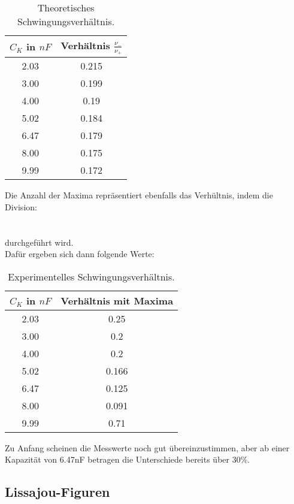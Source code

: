 \begin{table}
  \centering
  \caption{Theoretisches Schwingungsverhältnis.}
  \label{tab:tab6}
  \begin{tabular}{c c}
    \toprule
    \(C_K\) in $nF$ & Verhältnis \(\frac{\nu_-}{\nu_+}\)\\
    \midrule
    2.03 & 0.215\\
    3.00 & 0.199\\
    4.00 & 0.19\\
    5.02 & 0.184\\
    6.47 & 0.179\\
    8.00 & 0.175\\
    9.99 & 0.172\\
    \bottomrule
  \end{tabular}
\end{table}

Die Anzahl der Maxima repräsentiert ebenfalls das Verhültnis, indem die Division:
\ \\
\\
\ \\
durchgeführt wird.
\\
\newpage
Dafür ergeben sich dann folgende Werte:

\begin{table}
  \centering
  \caption{Experimentelles Schwingungsverhältnis.}
  \label{tab:tab7}
  \begin{tabular}{c c}
    \toprule
    \(C_K\) in $nF$ & Verhältnis mit Maxima\\
    \midrule
    2.03 & 0.25\\
    3.00 & 0.2\\
    4.00 & 0.2\\
    5.02 & 0.166\\
    6.47 & 0.125\\
    8.00 & 0.091\\
    9.99 & 0.71\\
    \bottomrule
  \end{tabular}
\end{table}
Zu Anfang scheinen die Messwerte noch gut übereinzustimmen, aber ab einer Kapazität von 6.47nF betragen die Unterschiede bereits über 30\%.

\newpage
\subsection{Lissajou-Figuren}

